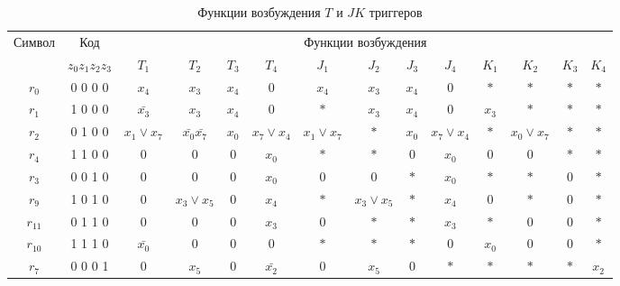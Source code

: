 \documentclass[a4paper,14pt,russian]{extarticle} %
\begin{document}
\begin{sidewaystable}			
	\centering		
	\caption{Функции возбуждения \(T\) и \(JK\) триггеров}	
	\renewcommand{\arraystretch}{0.8}
	\renewcommand{\tabcolsep}{0.35em}	
	\label{tab:triggersT_JK} 												
	\begin{tabular}{|c|c|c|c|c|c||c|c|c|c||c|c|c|c|}								
		\hline														
		Символ	& Код	& \multicolumn{12}{c|}{Функции возбуждения}	\\ \cline{2-14}											
		&\({z_0}{z_1}{z_2}{z_3}\)	 &\({T_1}\)	 &\({T_2}\)	 &\({T_3}\)	 &\({T_4}\)	 &\({J_1}\)	 &\({J_2}\)	 &\({J_3}\)	 &\({J_4}\)	 &\({K_1}\)	 &\({K_2}\)	 &\({K_3}\)	 &\({K_4}\)	\\ \hline
		\({r_{0}}\) & 	0 0 0 0 	 & \({x_{4}}\)	 & \({x_{3}}\)	 & \({x_{4}}\)	 & \(0\)	 & \({x_{4}}\)	 & \({x_{3}}\)	 & \({x_{4}}\)	 & \(0\)	 & \(*\)	 & \(*\)	 & \(*\)	 & \(*\)	\\ \hline
		\({r_{1}}\) & 	1 0 0 0 	 & \(\bar{x_{3}}\)	 & \({x_{3}}\)	 & \({x_{4}}\)	 & \(0\)	 & \(*\)	 & \({x_{3}}\)	 & \({x_{4}}\)	 & \(0\)	 & \({x_{3}}\)	 & \(*\)	 & \(*\)	 & \(*\)	\\ \hline
		\({r_{2}}\) & 	0 1 0 0 	 & \({x_{1}}\vee{x_{7}}\)	 & \(\bar{x_{0}}\bar{x_{7}}\)	 & \({x_{0}}\)	 & \({x_{7}}\vee{x_{4}}\)	 & \({x_{1}}\vee{x_{7}}\)	 & \(*\)	 & \({x_{0}}\)	 & \({x_{7}}\vee{x_{4}}\)	 & \(*\)	 & \({x_{0}}\vee{x_{7}}\)	 & \(*\)	 & \(*\)	\\ \hline
		\({r_{4}}\) & 	1 1 0 0 	 & \(0\)	 & \(0\)	 & \(0\)	 & \({x_{0}}\)	 & \(*\)	 & \(*\)	 & \(0\)	 & \({x_{0}}\)	 & \(0\)	 & \(0\)	 & \(*\)	 & \(*\)	\\ \hline
		\({r_{3}}\) & 	0 0 1 0 	 & \(0\)	 & \(0\)	 & \(0\)	 & \({x_{0}}\)	 & \(0\)	 & \(0\)	 & \(*\)	 & \({x_{0}}\)	 & \(*\)	 & \(*\)	 & \(0\)	 & \(*\)	\\ \hline
		\({r_{9}}\) & 	1 0 1 0 	 & \(0\)	 & \({x_{3}}\vee{x_{5}}\)	 & \(0\)	 & \({x_{4}}\)	 & \(*\)	 & \({x_{3}}\vee{x_{5}}\)	 & \(*\)	 & \({x_{4}}\)	 & \(0\)	 & \(*\)	 & \(0\)	 & \(*\)	\\ \hline
		\({r_{11}}\) & 	0 1 1 0 	 & \(0\)	 & \(0\)	 & \(0\)	 & \({x_{3}}\)	 & \(0\)	 & \(*\)	 & \(*\)	 & \({x_{3}}\)	 & \(*\)	 & \(0\)	 & \(0\)	 & \(*\)	\\ \hline
		\({r_{10}}\) & 	1 1 1 0 	 & \(\bar{x_{0}}\)	 & \(0\)	 & \(0\)	 & \(0\)	 & \(*\)	 & \(*\)	 & \(*\)	 & \(0\)	 & \({x_{0}}\)	 & \(0\)	 & \(0\)	 & \(*\)	\\ \hline
		\({r_{7}}\) & 	0 0 0 1 	 & \(0\)	 & \({x_{5}}\)	 & \(0\)	 & \(\bar{x_{2}}\)	 & \(0\)	 & \({x_{5}}\)	 & \(0\)	 & \(*\)	 & \(*\)	 & \(*\)	 & \(*\)	 & \({x_{2}}\)	\\ \hline

\end{tabular}
\end{sidewaystable}
\end{document}

